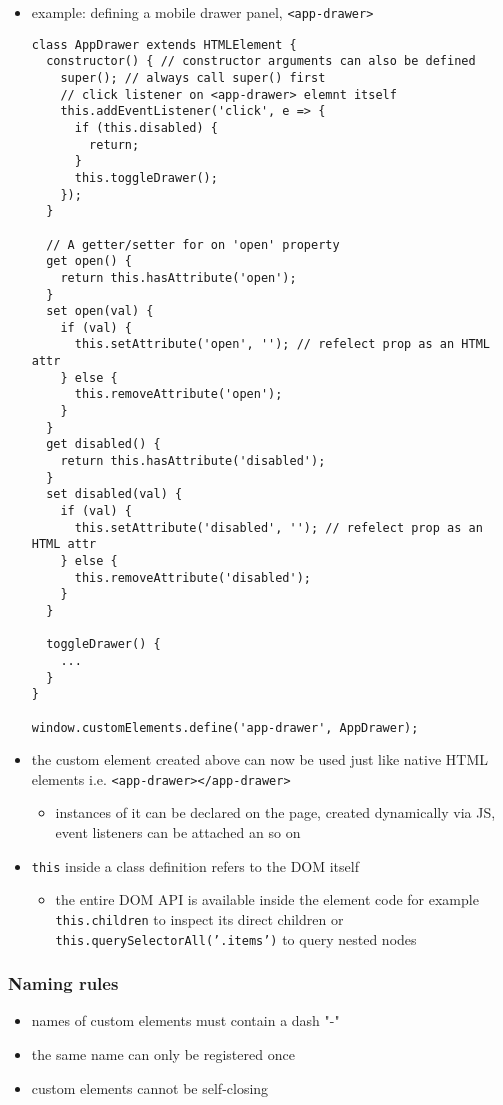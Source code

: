 \documentclass[11pt]{article}
\begin{document}
\begin{itemize}
\item example: defining a mobile drawer panel, \texttt{<app-drawer>}
\lstset{breaklines=true,language=js,label= ,caption= ,captionpos=b,numbers=none}
\begin{lstlisting}
class AppDrawer extends HTMLElement {
  constructor() { // constructor arguments can also be defined
    super(); // always call super() first
    // click listener on <app-drawer> elemnt itself
    this.addEventListener('click', e => {
      if (this.disabled) {
        return;
      }
      this.toggleDrawer();
    });
  }

  // A getter/setter for on 'open' property
  get open() {
    return this.hasAttribute('open');
  }
  set open(val) {
    if (val) {
      this.setAttribute('open', ''); // refelect prop as an HTML attr
    } else {
      this.removeAttribute('open');
    }
  }
  get disabled() {
    return this.hasAttribute('disabled');
  }
  set disabled(val) {
    if (val) {
      this.setAttribute('disabled', ''); // refelect prop as an HTML attr
    } else {
      this.removeAttribute('disabled');
    }
  }

  toggleDrawer() {
    ... 
  }
}

window.customElements.define('app-drawer', AppDrawer);
\end{lstlisting}
\item the custom element created above can now be used just like native HTML elements i.e. \texttt{<app-drawer></app-drawer>}
\begin{itemize}
\item instances of it can be declared on the page, created dynamically via JS, event listeners can be attached an so on
\end{itemize}
\item \texttt{this} inside a class definition refers to the DOM itself
\begin{itemize}
\item the entire DOM API is available inside the element code for example \texttt{this.children} to inspect its direct children or \texttt{this.querySelectorAll('.items')} to query nested nodes
\end{itemize}
\end{itemize}
\subsubsection{Naming rules}
\label{sec:org553cee5}
\begin{itemize}
\item names of custom elements must contain a dash "-"
\item the same name can only be registered once
\item custom elements cannot be self-closing
\end{itemize}
\end{document}
